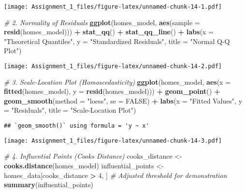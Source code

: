 \documentclass[
]{article}
\newenvironment{Shaded}{\begin{snugshade}}{\end{snugshade}}
\newcommand{\AttributeTok}[1]{\textcolor[rgb]{0.13,0.29,0.53}{#1}}
\newcommand{\CommentTok}[1]{\textcolor[rgb]{0.56,0.35,0.01}{\textit{#1}}}
\newcommand{\ConstantTok}[1]{\textcolor[rgb]{0.56,0.35,0.01}{#1}}
\newcommand{\DecValTok}[1]{\textcolor[rgb]{0.00,0.00,0.81}{#1}}
\newcommand{\FunctionTok}[1]{\textcolor[rgb]{0.13,0.29,0.53}{\textbf{#1}}}
\newcommand{\NormalTok}[1]{#1}
\newcommand{\OtherTok}[1]{\textcolor[rgb]{0.56,0.35,0.01}{#1}}
\newcommand{\SpecialCharTok}[1]{\textcolor[rgb]{0.81,0.36,0.00}{\textbf{#1}}}
\newcommand{\StringTok}[1]{\textcolor[rgb]{0.31,0.60,0.02}{#1}}
\begin{document}
\texttt{[image: Assignment\_1\_files/figure-latex/unnamed-chunk-14-1.pdf]}

\begin{Shaded}
\begin{Highlighting}[]
\CommentTok{\# 2. Normality of Residuals}
\FunctionTok{ggplot}\NormalTok{(homes\_model, }\FunctionTok{aes}\NormalTok{(}\AttributeTok{sample =} \FunctionTok{resid}\NormalTok{(homes\_model))) }\SpecialCharTok{+}
  \FunctionTok{stat\_qq}\NormalTok{() }\SpecialCharTok{+}
  \FunctionTok{stat\_qq\_line}\NormalTok{() }\SpecialCharTok{+}
  \FunctionTok{labs}\NormalTok{(}\AttributeTok{x =} \StringTok{"Theoretical Quantiles"}\NormalTok{, }\AttributeTok{y =} \StringTok{"Standardized Residuals"}\NormalTok{, }\AttributeTok{title =} \StringTok{"Normal Q{-}Q Plot"}\NormalTok{)}
\end{Highlighting}
\end{Shaded}

\texttt{[image: Assignment\_1\_files/figure-latex/unnamed-chunk-14-2.pdf]}

\begin{Shaded}
\begin{Highlighting}[]
\CommentTok{\# 3. Scale{-}Location Plot (Homoscedasticity)}
\FunctionTok{ggplot}\NormalTok{(homes\_model, }\FunctionTok{aes}\NormalTok{(}\AttributeTok{x =} \FunctionTok{fitted}\NormalTok{(homes\_model), }\AttributeTok{y =} \FunctionTok{resid}\NormalTok{(homes\_model))) }\SpecialCharTok{+}
  \FunctionTok{geom\_point}\NormalTok{() }\SpecialCharTok{+}
  \FunctionTok{geom\_smooth}\NormalTok{(}\AttributeTok{method =} \StringTok{"loess"}\NormalTok{, }\AttributeTok{se =} \ConstantTok{FALSE}\NormalTok{) }\SpecialCharTok{+}
  \FunctionTok{labs}\NormalTok{(}\AttributeTok{x =} \StringTok{"Fitted Values"}\NormalTok{, }\AttributeTok{y =} \StringTok{"Residuals"}\NormalTok{, }\AttributeTok{title =} \StringTok{"Scale{-}Location Plot"}\NormalTok{)}
\end{Highlighting}
\end{Shaded}

\begin{verbatim}
## `geom_smooth()` using formula = 'y ~ x'
\end{verbatim}

\texttt{[image: Assignment\_1\_files/figure-latex/unnamed-chunk-14-3.pdf]}

\begin{Shaded}
\begin{Highlighting}[]
\CommentTok{\# 4. Influential Points (Cook\textquotesingle{}s Distance)}
\NormalTok{cooks\_distance }\OtherTok{\textless{}{-}} \FunctionTok{cooks.distance}\NormalTok{(homes\_model)}
\NormalTok{influential\_points }\OtherTok{\textless{}{-}}\NormalTok{ homes\_data[cooks\_distance }\SpecialCharTok{\textgreater{}} \DecValTok{4}\NormalTok{, ]  }\CommentTok{\# Adjusted threshold for demonstration}
\FunctionTok{summary}\NormalTok{(influential\_points)}
\end{Highlighting}
\end{Shaded}
\end{document}
